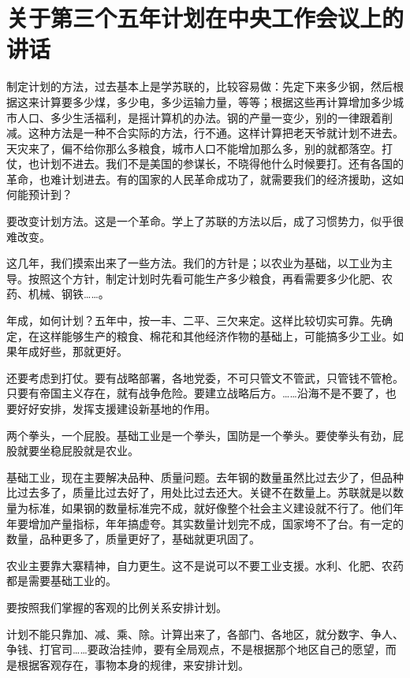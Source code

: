 \section[关于第三个五年计划在中央工作会议上的讲话（一九六四年六月六日）]{关于第三个五年计划在中央工作会议上的讲话}


制定计划的方法，过去基本上是学苏联的，比较容易做：先定下来多少钢，然后根据这来计算要多少煤，多少电，多少运输力量，等等；根据这些再计算增加多少城市人口、多少生活福利，是摇计算机的办法。钢的产量一变少，别的一律跟着削减。这种方法是一种不合实际的方法，行不通。这样计算把老天爷就计划不进去。天灾来了，偏不给你那么多粮食，城市人口不能增加那么多，别的就都落空。打仗，也计划不进去。我们不是美国的参谋长，不晓得他什么时候要打。还有各国的革命，也难计划进去。有的国家的人民革命成功了，就需要我们的经济援助，这如何能预计到？

要改变计划方法。这是一个革命。学上了苏联的方法以后，成了习惯势力，似乎很难改变。

这几年，我们摸索出来了一些方法。我们的方针是；以农业为基础，以工业为主导。按照这个方针，制定计划时先看可能生产多少粮食，再看需要多少化肥、农药、机械、钢铁……。

年成，如何计划？五年中，按一丰、二平、三欠来定。这样比较切实可靠。先确定，在这样能够生产的粮食、棉花和其他经济作物的基础上，可能搞多少工业。如果年成好些，那就更好。

还要考虑到打仗。要有战略部署，各地党委，不可只管文不管武，只管钱不管枪。只要有帝国主义存在，就有战争危险。要建立战略后方。……沿海不是不要了，也要好好安排，发挥支援建设新基地的作用。

两个拳头，一个屁股。基础工业是一个拳头，国防是一个拳头。要使拳头有劲，屁股就要坐稳屁股就是农业。

基础工业，现在主要解决品种、质量问题。去年钢的数量虽然比过去少了，但品种比过去多了，质量比过去好了，用处比过去还大。关键不在数量上。苏联就是以数量为标准，如果钢的数量标准完不成，就好像整个社会主义建设就不行了。他们年年要增加产量指标，年年搞虚夸。其实数量计划完不成，国家垮不了台。有一定的数量，品种更多了，质量更好了，基础就更巩固了。

农业主要靠大寨精神，自力更生。这不是说可以不要工业支援。水利、化肥、农药都是需要基础工业的。

要按照我们掌握的客观的比例关系安排计划。

计划不能只靠加、减、乘、除。计算出来了，各部门、各地区，就分数字、争人、争钱、打官司……要政治挂帅，要有全局观点，不是根据那个地区自己的愿望，而是根据客观存在，事物本身的规律，来安排计划。

